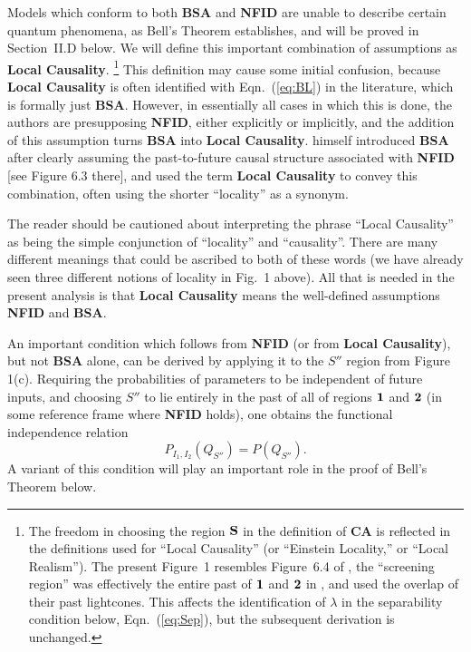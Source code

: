 \documentclass[onecolumn, nofootinbib, 12pt]{revtex4-1}
\newcommand{\eq}[1]{{Eqn.~(\ref{#1})}}
\begin{document}
Models which conform to both {\bf BSA} and {\bf NFID} are unable to describe certain quantum phenomena, as Bell's Theorem establishes, and will be proved in Section~II.D below.  We will define this important combination of assumptions as {\bf Local Causality}.%
\footnote{The freedom in choosing the region $\bf{S}$ in the definition of {\bf CA} is reflected in the definitions used for ``Local Causality'' (or ``Einstein Locality,'' or ``Local Realism'').  The present Figure~1 resembles Figure~6.4 of \textcite{bell1990}, the ``screening region'' was effectively the entire past of $\bf 1$ and $\bf 2$ in \textcite{bell1981}, and \textcite{bell1976b} used the overlap of their past lightcones.  This affects the identification of $\lambda$ in the separability condition below, Eqn.~(\ref{eq:Sep}), but the subsequent derivation is unchanged.}
This definition may cause some initial confusion, because {\bf Local Causality} is often identified with \eq{eq:BL} in the literature, which is formally just {\bf BSA}.  However, in essentially all cases in which this is done, the authors are presupposing {\bf NFID}, {either explicitly or implicitly,} and the addition of this assumption turns {\bf BSA} into {\bf Local Causality}.  \textcite{bell1990} himself introduced {\bf BSA} after clearly assuming the past-to-future causal structure associated with {\bf NFID} [see Figure 6.3 there], and used the term {\bf Local Causality} to convey this combination, often using the shorter ``locality'' as a synonym.

The reader should be cautioned about interpreting the phrase ``Local Causality'' as being the simple conjunction of ``locality'' and ``causality''.  There are many different meanings that could be ascribed to both of these words (we have already seen three different notions of locality in Fig.~1 above).   All that is needed in the present analysis is that {\bf Local Causality} means the well-defined assumptions {\bf NFID} and {\bf BSA}.

An important condition which follows from {\bf NFID} (or from {\bf Local Causality}), but not {\bf BSA} alone, can be derived by applying it to the $S''$ region from Figure 1(c).  Requiring the probabilities of parameters to be independent of future inputs, and choosing $S''$ to lie entirely in the past of all of regions $\bf{1}$ and $\bf{2}$ (in some reference frame where {\bf NFID} holds), one obtains the functional independence relation
\begin{equation}
\label{eq:SI2}
P_{I_1,I_2}(Q_{S''}) = P(Q_{S''}) .
\end{equation}
A variant of this condition will play an important role in the proof of Bell's Theorem below.
\end{document}
